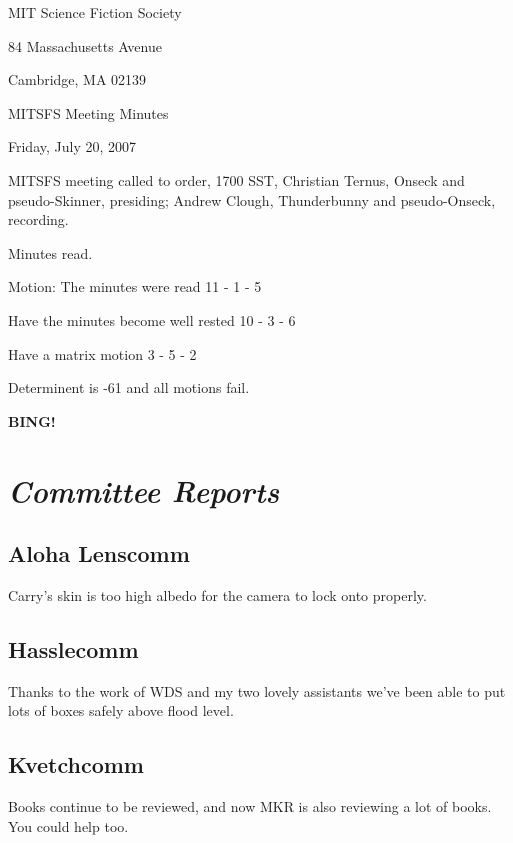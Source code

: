 \documentclass[10pt]{article}
\newcommand{\bing}{{\bf BING!} }
\newcommand{\goto}[1]{\bing \vskip 12pt \section*{{\em{#1}}}}
\begin{document}
\begin{center}

MIT Science Fiction Society

84 Massachusetts Avenue

Cambridge, MA 02139

\vspace{12pt}

MITSFS Meeting Minutes

Friday, July 20, 2007

\end{center}

\vspace{18pt}

\setlength{\parskip}{6pt}

\noindent
MITSFS meeting called to order, 1700 SST,
Christian Ternus, Onseck and pseudo-Skinner, presiding; Andrew Clough, Thunderbunny and pseudo-Onseck, recording.

Minutes read.

Motion:  The minutes were read               11 - 1 - 5

         Have the minutes become well rested 10 - 3 - 6

         Have a matrix motion                3  - 5 - 2

                     Determinent is -61 and all motions fail. 

\goto{Committee Reports}

\subsection*{Aloha Lenscomm}

Carry's skin is too high albedo for the camera to lock onto properly.

\subsection*{Hasslecomm}

Thanks to the work of WDS and my two lovely assistants we've been able to put lots of boxes safely above flood level.

\subsection*{Kvetchcomm}

Books continue to be reviewed, and now MKR is also reviewing a lot of books.  You could help too.

\end{document}
